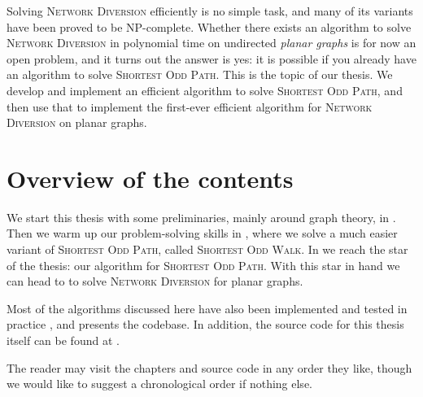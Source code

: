 Solving \textsc{Network Diversion} efficiently is no simple task, and many of its variants have been proved to be NP-complete. Whether there exists an algorithm to solve \textsc{Network Diversion} in polynomial time on undirected \emph{planar graphs} is for now an open problem, and it turns out the answer is yes: it is possible if you already have an algorithm to solve \textsc{Shortest Odd Path}. This is the topic of our thesis. We develop and implement an efficient algorithm to solve \textsc{Shortest Odd Path}, and then use that to implement the first-ever efficient algorithm for \textsc{Network Diversion} on planar graphs.

\section*{Overview of the contents}
We start this thesis with some preliminaries, mainly around graph theory, in . Then we warm up our problem-solving skills in , where we solve a much easier variant of \textsc{Shortest Odd Path}, called \textsc{Shortest Odd Walk}. In  we reach the star of the thesis: our algorithm for \textsc{Shortest Odd Path}. With this star in hand we can head to  to solve \textsc{Network Diversion} for planar graphs. 

Most of the algorithms discussed here have also been implemented and tested in practice \cite{source:codebase}, and  presents the codebase. In addition, the source code for this thesis itself can be found at \cite{source:thesis}.

The reader may visit the chapters and source code in any order they like, though we would like to suggest a chronological order if nothing else.
